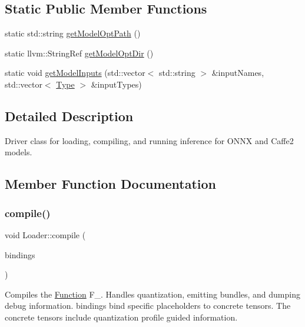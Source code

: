 \subsection*{Static Public Member Functions}
\begin{DoxyCompactItemize}
\item 
static std\+::string \hyperlink{classglow_1_1_loader_af71f07b76373e50b28366c9250aedc84}{get\+Model\+Opt\+Path} ()
\item 
static llvm\+::\+String\+Ref \hyperlink{classglow_1_1_loader_a4b7a9059016c43c4f81fa33d500a65f3}{get\+Model\+Opt\+Dir} ()
\item 
static void \hyperlink{classglow_1_1_loader_ae2b9d671348ef892b4a752988414b39f}{get\+Model\+Inputs} (std\+::vector$<$ std\+::string $>$ \&input\+Names, std\+::vector$<$ \hyperlink{structglow_1_1_type}{Type} $>$ \&input\+Types)
\end{DoxyCompactItemize}


\subsection{Detailed Description}
Driver class for loading, compiling, and running inference for O\+N\+NX and Caffe2 models. 

\subsection{Member Function Documentation}
\mbox{\label{classglow_1_1_loader_ae4de9bae2b55c206b465ca7bef1c84fc}} 
\subsubsection{\texorpdfstring{compile()}{compile()}\hspace{0.1cm}{\footnotesize\ttfamily [1/2]}}
{\footnotesize\ttfamily void Loader\+::compile (\begin{DoxyParamCaption}\item[{\hyperlink{classglow_1_1_placeholder_bindings}{Placeholder\+Bindings} \&}]{bindings }\end{DoxyParamCaption})}

Compiles the \hyperlink{classglow_1_1_function}{Function} F\+\_\+. Handles quantization, emitting bundles, and dumping debug information. {\ttfamily bindings} bind specific placeholders to concrete tensors. The concrete tensors include quantization profile guided information. \mbox{\label{classglow_1_1_loader_a7e9422518c187cb81a554c4cc1b87769}} 
